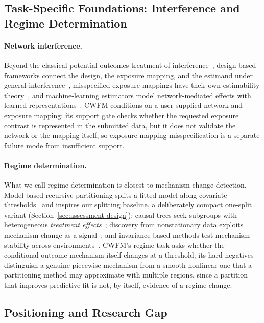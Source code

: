 \documentclass[electronics,article,submit,oneauthor]{Definitions/mdpi}
\begin{document}
\subsection{Task-Specific Foundations: Interference and Regime Determination}\label{sec:related-tasks}

\paragraph{Network interference.} Beyond the classical potential-outcomes treatment of interference~\cite{hudgens2008interference}, design-based frameworks connect the design, the exposure mapping, and the estimand under general interference~\cite{aronow2017interference}, misspecified exposure mappings have their own estimability theory~\cite{savje2024misspecified}, and machine-learning estimators model network-mediated effects with learned representations~\cite{ma2021networked}. CWFM conditions on a user-supplied network and exposure mapping: its support gate checks whether the requested exposure contrast is represented in the submitted data, but it does not validate the network or the mapping itself, so exposure-mapping misspecification is a separate failure mode from insufficient support.

\paragraph{Regime determination.} What we call regime determination is closest to mechanism-change detection. Model-based recursive partitioning splits a fitted model along covariate thresholds~\cite{zeileis2008mob} and inspires our splitting baseline, a deliberately compact one-split variant (Section~\ref{sec:assessment-design}); causal trees seek subgroups with heterogeneous \emph{treatment effects}~\cite{athey2016recursive}; discovery from nonstationary data exploits mechanism change as a signal~\cite{huang2020heterogeneous}; and invariance-based methods test mechanism stability across environments~\cite{peters2016invariant}. CWFM's regime task asks whether the conditional outcome mechanism itself changes at a threshold; its hard negatives distinguish a genuine piecewise mechanism from a smooth nonlinear one that a partitioning method may approximate with multiple regions, since a partition that improves predictive fit is not, by itself, evidence of a regime change.

\subsection{Positioning and Research Gap}\label{sec:related-gap}
\end{document}
